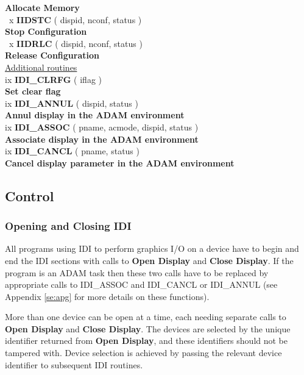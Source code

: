 \begin{tabbing}
                \> \> {\bf Allocate Memory}\\ [1.5ex]
~x \> {\bf IIDSTC} \> ( dispid, nconf, status )\\
                \> \> {\bf Stop Configuration}\\ [1.5ex]
~x \> {\bf IIDRLC} \> ( dispid, nconf, status )\\
                \> \> {\bf Release Configuration}\\ [1.5ex]
\> \underline{Additional routines}\\ [1.5ex]
ix  \> {\bf IDI\_CLRFG} \> ( iflag )\\
                \> \> {\bf Set clear flag}\\ [1.5ex]
ix \> {\bf IDI\_ANNUL} \> ( dispid, status )\\
                \> \> {\bf Annul display in the ADAM environment}\\ [1.5ex]
ix \> {\bf IDI\_ASSOC} \> ( pname, acmode, dispid, status )\\
                \> \> {\bf Associate display in the ADAM environment}\\ [1.5ex]
ix \> {\bf IDI\_CANCL} \> ( pname, status )\\
                \> \> {\bf Cancel display parameter in the ADAM environment}\\
                      [1.5ex]
\end{tabbing}

\subsection{Control}

\subsubsection{Opening and Closing IDI}

All programs using IDI to perform graphics I/O on a device have to begin and
end the IDI sections with calls to {\bf Open Display} and {\bf Close Display}.
If the program is an ADAM task then these two calls have to be replaced by
appropriate calls to IDI\_ASSOC and IDI\_CANCL or IDI\_ANNUL (see Appendix
\ref{se:apg} for more details on these functions).

More than one device can be open at a time, each needing separate calls
to {\bf Open Display} and {\bf Close Display}. The devices are selected
by the unique identifier returned from {\bf Open Display}, and these
identifiers should not be tampered with. Device selection is achieved by
passing the relevant device identifier to subsequent IDI routines.


